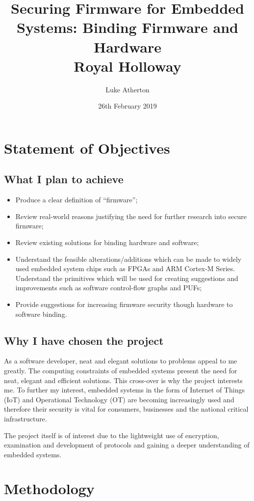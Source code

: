 \documentclass[10pt]{report}
\title{
	{Securing Firmware for Embedded Systems: Binding Firmware and Hardware}\\
	{\large Royal Holloway}\\
}
\author{Luke Atherton}
\date{26th February 2019}
\begin{document}
\maketitle

\chapter*{Statement of Objectives}

\section*{What I plan to achieve}
\begin{itemize}
	\item Produce a clear definition of ``firmware'';
	\item Review real-world reasons justifying the need for further research into secure firmware;
	\item Review existing solutions for binding hardware and software;
	\item Understand the feasible alterations/additions which can be made to widely used embedded system chips such as FPGAs and ARM Cortex-M Series. Understand the primitives which will be used for creating suggestions and improvements such as software control-flow graphs and PUFs;
	\item Provide suggestions for increasing firmware security though hardware to software binding.
\end{itemize}

\section*{Why I have chosen the project}
As a software developer, neat and elegant solutions to problems appeal to me greatly. The computing constraints of embedded systems present the need for neat, elegant and efficient solutions. This cross-over is why the project interests me. To further my interest, embedded systems in the form of Internet of Things (IoT) and Operational Technology (OT) are becoming increasingly used and therefore their security is vital for consumers, businesses and the national critical infrastructure.

The project itself is of interest due to the lightweight use of encryption, examination and development of protocols and gaining a deeper understanding of embedded systems.

\chapter*{Methodology}
\end{document}
